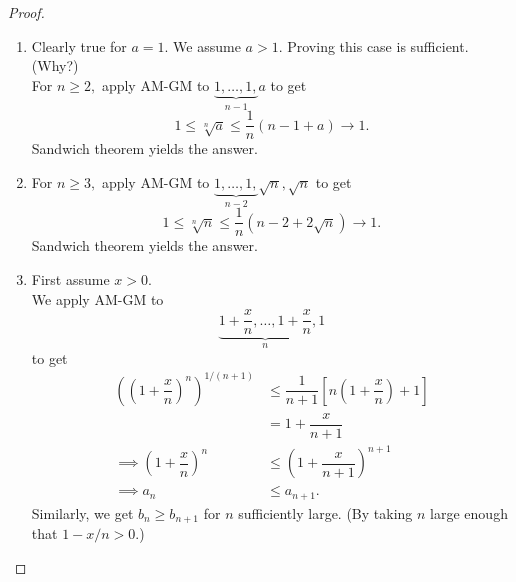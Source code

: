 \coramgmhm*\label{cor:coramgmhm2}
\begin{flushright}\hyperref[cor:coramgmhm]{\upsym}\end{flushright}
\begin{proof}
	\begin{enumerate}[label = (\roman*)]
		\item Clearly true for $a = 1.$ We assume $a > 1.$ Proving this case is sufficient. (Why?)\\
		For $n \ge 2,$ apply AM-GM to $\underbrace{1, \ldots, 1,}_{n-1} a$ to get
		\begin{equation*} 
			1 \le \sqrt[n]{a} \le \dfrac{1}{n}(n-1 + a) \to 1.
		\end{equation*}
		Sandwich theorem yields the answer.
		\item For $n \ge 3,$ apply AM-GM to $\underbrace{1, \ldots, 1,}_{n-2} \sqrt{n}, \sqrt{n}$ to get
		\begin{equation*} 
			1 \le \sqrt[n]{n} \le \dfrac{1}{n}(n-2 + 2\sqrt{n}) \to 1.
		\end{equation*}
		Sandwich theorem yields the answer.
		\item First assume $x > 0.$\\
		We apply AM-GM to
		\begin{equation*} 
			\underbrace{1 + \dfrac{x}{n}, \ldots, 1 + \dfrac{x}{n}}_{n}, 1
		\end{equation*}
		to get
		\begin{align*} 
			\left(\left(1 + \dfrac{x}{n}\right)^n\right)^{1/(n+1)} &\le \dfrac{1}{n+1}\left[n\left(1 + \dfrac{x}{n}\right) + 1\right]\\
			&= 1 + \dfrac{x}{n+1}\\
			\implies \left(1 + \dfrac{x}{n}\right)^n &\le \left(1 + \dfrac{x}{n+1}\right)^{n+1}\\
			\implies a_n &\le a_{n+1}.
		\end{align*}
		Similarly, we get $b_n \ge b_{n+1}$ for $n$ sufficiently large. (By taking $n$ large enough that $1 - x/n > 0$.)


\end{enumerate}
\end{proof}
